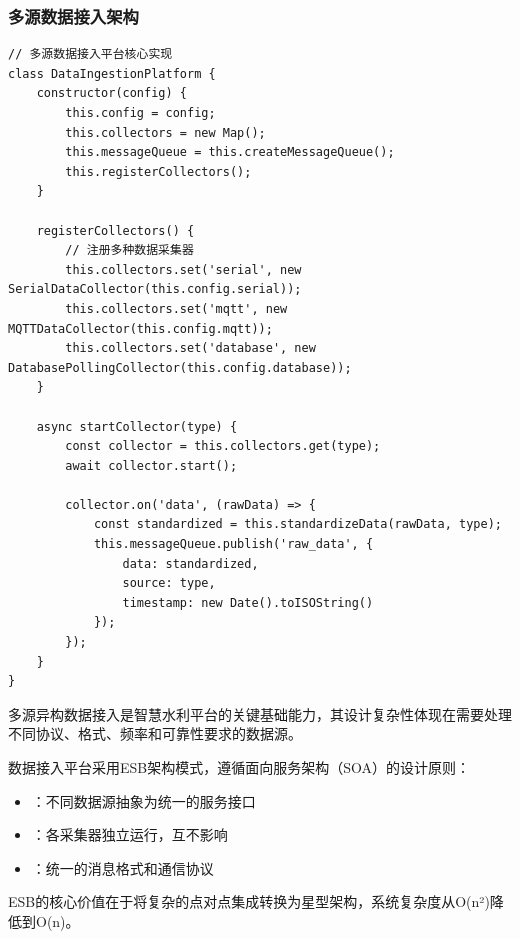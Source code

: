 \hypertarget{ux591aux6e90ux6570ux636eux63a5ux5165ux67b6ux6784}{%
\subsubsection{多源数据接入架构}\label{ux591aux6e90ux6570ux636eux63a5ux5165ux67b6ux6784}}

\begin{lstlisting}[style=javascript]
// 多源数据接入平台核心实现
class DataIngestionPlatform {
    constructor(config) {
        this.config = config;
        this.collectors = new Map();
        this.messageQueue = this.createMessageQueue();
        this.registerCollectors();
    }
    
    registerCollectors() {
        // 注册多种数据采集器
        this.collectors.set('serial', new SerialDataCollector(this.config.serial));
        this.collectors.set('mqtt', new MQTTDataCollector(this.config.mqtt));
        this.collectors.set('database', new DatabasePollingCollector(this.config.database));
    }
    
    async startCollector(type) {
        const collector = this.collectors.get(type);
        await collector.start();
        
        collector.on('data', (rawData) => {
            const standardized = this.standardizeData(rawData, type);
            this.messageQueue.publish('raw_data', {
                data: standardized,
                source: type,
                timestamp: new Date().toISOString()
            });
        });
    }
}
\end{lstlisting}


多源异构数据接入是智慧水利平台的关键基础能力，其设计复杂性体现在需要处理不同协议、格式、频率和可靠性要求的数据源。


数据接入平台采用ESB架构模式，遵循面向服务架构（SOA）的设计原则：

\begin{itemize}
\tightlist
\item
  ：不同数据源抽象为统一的服务接口
\item
  ：各采集器独立运行，互不影响
\item
  ：统一的消息格式和通信协议
\end{itemize}

ESB的核心价值在于将复杂的点对点集成转换为星型架构，系统复杂度从O(n²)降低到O(n)。

